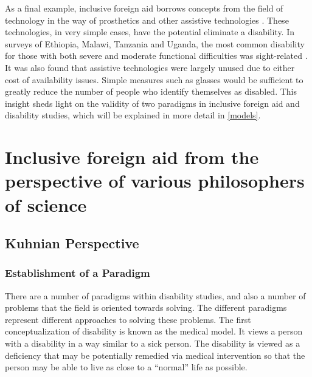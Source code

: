 \documentclass[a4paper]{article}
\begin{document}
As a final example, inclusive foreign aid borrows concepts from the field of
technology in the way of prosthetics and other assistive technologies
\citep{roulstone2016disability}. These technologies, in very simple cases,
have the potential eliminate a disability. In surveys of Ethiopia, Malawi,
Tanzania and Uganda, the most common disability for those with both severe and
moderate functional difficulties was sight-related
\citep{mitra2018disability}. It was also found that assistive technologies
were largely unused due to either cost of availability issues. Simple measures
such as glasses would be sufficient to greatly reduce the number of people who
identify themselves as disabled. This insight sheds light on the validity of
two paradigms in inclusive foreign aid and disability studies, which will be
explained in more detail in \autoref{models}.


\newpage
\section{Inclusive foreign aid from the perspective of various philosophers of
science}

\subsection{Kuhnian Perspective}

\subsubsection{Establishment of a Paradigm}
\label{models}

There are a number of paradigms within disability studies, and also a number
of problems that the field is oriented towards solving. The different
paradigms represent different approaches to solving these problems. The first
conceptualization of disability is known as the medical model. It views a
person with a disability in a way similar to a sick person. The disability is
viewed as a deficiency that may be potentially remedied via medical
intervention so that the person may be able to live as close to a ``normal''
life as possible. 
\end{document}
